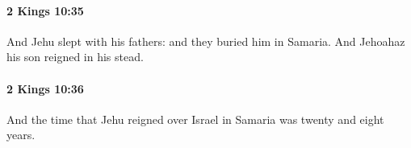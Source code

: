 		\paragraph{2 Kings 10:35} %
			\label{2KINGS-10-35}

			And Jehu slept with his fathers: and they buried him in Samaria. And Jehoahaz his son reigned in his stead.


		\paragraph{2 Kings 10:36} %
			\label{2KINGS-10-36}

			And the time that Jehu reigned over Israel in Samaria was twenty and eight years.

